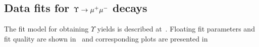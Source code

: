 \subsection[$Upsilon$ data fits]{Data fits for \texorpdfstring{$\Upsilon \rightarrow \mu^+\mu^-$}{Y --> mu+mu-} decays}
\label{sec:upsilon:fits}

The fit model for obtaining $\Upsilon$ yields  is described
at~. Floating fit parameters and fit quality are shown
in~ and corresponding plots are presented
in~




